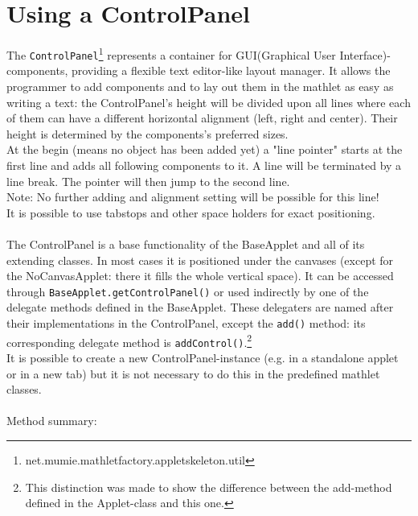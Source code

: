 \documentclass[a4paper,12pt]{book}
\begin{document}
\newpage
\section{Using a ControlPanel}
  The \verb|ControlPanel|\footnote{net.mumie.mathletfactory.appletskeleton.util} 
  represents a container for GUI(Graphical User Interface)-components,
  providing a flexible text editor-like layout manager. It allows the programmer 
  to add components and to lay out them in the mathlet as easy as writing a text: the
  ControlPanel's height will be divided upon all lines where each of them can have
  a different horizontal alignment (left, right and center). Their height is determined
  by the components's preferred sizes.\\
  At the begin (means no object has been added yet) a "line pointer" starts at the first
  line and adds all following components to it. A line will be terminated by a line
  break. The pointer will then jump to the second line.\\
  Note: No further adding and alignment setting will be possible for this line!\\
  It is possible to use tabstops and other space holders for exact positioning.
  \\\\
  The ControlPanel is a base functionality of the BaseApplet and all of its
  extending classes. In most cases it is positioned under the canvases (except for
  the NoCanvasApplet: there it fills the whole vertical space). It can be accessed
  through \verb|BaseApplet.getControlPanel()| or used indirectly by one of the delegate
  methods defined in the BaseApplet. These delegaters are named after their
  implementations in the ControlPanel, except the \verb|add()| method: its corresponding
  delegate method is \verb|addControl()|.\footnote{This distinction was made
  to show the difference between the add-method defined in the Applet-class
  and this one.}\\
  It is possible to create a new ControlPanel-instance (e.g. in a standalone applet
  or in a new tab) but it is not necessary to do this in the predefined mathlet
  classes.
  \\\\
  Method summary:
\end{document}
